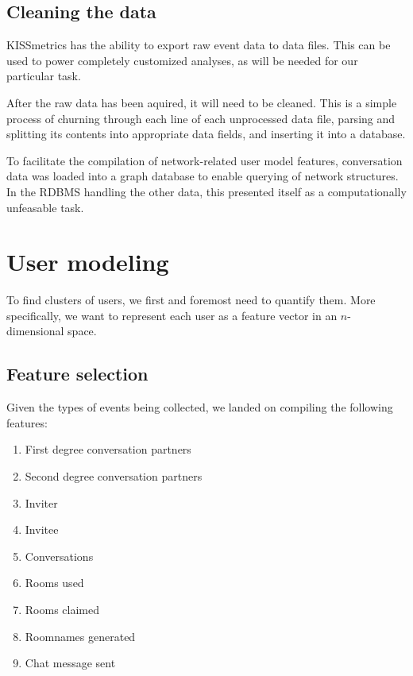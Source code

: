 \subsection{Cleaning the data}
\label{approach:sec:cleaning_data}

KISSmetrics has the ability to export raw event data to data files. This can be used to power completely customized analyses, as will be needed for our particular task.

After the raw data has been aquired, it will need to be cleaned. This is a simple process of churning through each line of each unprocessed data file, parsing and splitting its contents into appropriate data fields, and inserting it into a database.

To facilitate the compilation of network-related user model features, conversation data was loaded into a graph database to enable querying of network structures. In the RDBMS handling the other data, this presented itself as a computationally unfeasable task.


\section{User modeling} %
\label{approach:sec:user_modeling}

To find clusters of users, we first and foremost need to quantify them. More specifically, we want to represent each user as a feature vector in an $n$-dimensional space.

\subsection{Feature selection}
\label{approach:sec:feature_selection}

Given the types of events being collected, we landed on compiling the following features:

\begin{enumerate}
  \item First degree conversation partners
  \item Second degree conversation partners
  \item Inviter
  \item Invitee
  \item Conversations
  \item Rooms used
  \item Rooms claimed
  \item Roomnames generated
  \item Chat message sent
\end{enumerate}

